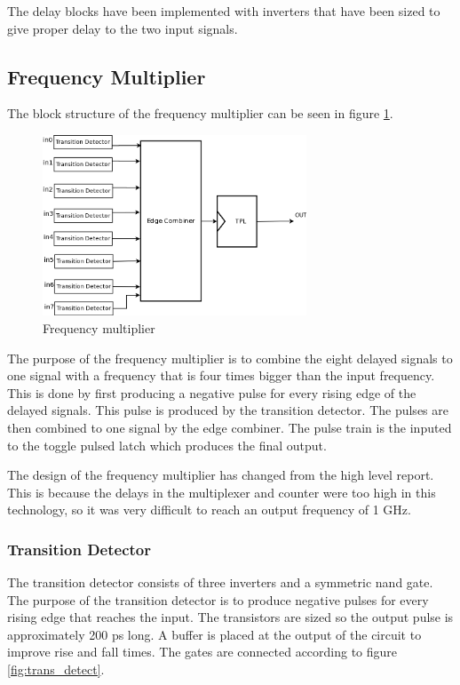 \documentclass[a4paper,12pt]{article} \usepackage{graphicx}
\begin{document}
The delay blocks have been implemented with inverters that have been
sized to give proper delay to the two input signals.

\subsection{Frequency Multiplier}
The block structure of the frequency multiplier can be seen in figure 
\ref{fig:freq_mult}.
\begin{figure}[p]
        \centering
        \includegraphics[width=0.7\textwidth]{../Bilder/freq_mult_trans.png}
        \caption{Frequency multiplier}
        \label{fig:freq_mult}
\end{figure}

The purpose of the frequency multiplier is to combine the eight delayed signals
to one signal with a frequency that is four times bigger than the input
frequency. This is done by first producing a negative pulse for every rising
edge of the delayed signals. This pulse is produced by the transition detector.
The pulses are then combined to one signal by the edge combiner. The pulse
train is the inputed to the toggle pulsed latch which produces the final output.

The design of the frequency multiplier has changed from the high level report.
This is because the delays in the multiplexer and counter were too high in this
technology, so it was very difficult to reach an output frequency of 1 GHz.

\subsubsection{Transition Detector}
\label{sec:trans_detect}
The transition detector consists of three inverters and a symmetric nand gate.
The purpose of the transition detector is to produce negative pulses for every
rising edge that reaches the input. The transistors are sized so the output
pulse is approximately 200 ps long. A buffer is placed at the output of the
circuit to improve rise and fall times.
The gates are connected according to figure \ref{fig:trans_detect}.
\end{document}

